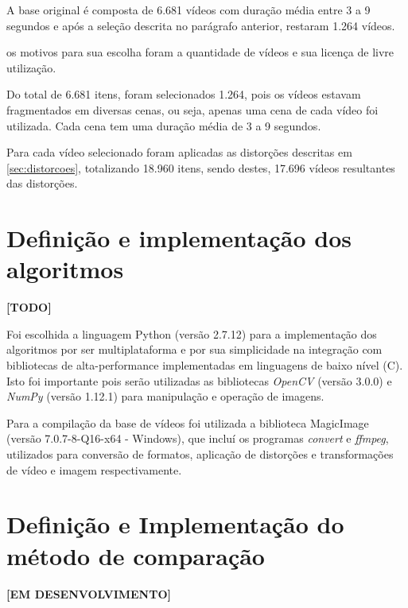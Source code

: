 A base original é composta de 6.681 vídeos com duração média entre 3 a 9 segundos e após a seleção descrita no parágrafo anterior, restaram 1.264 vídeos. 

os motivos para sua escolha foram a quantidade de vídeos e sua licença de livre utilização. 

Do total de 6.681 itens, foram selecionados 1.264, pois os vídeos estavam fragmentados em diversas cenas, ou seja, apenas uma cena de cada vídeo foi utilizada. Cada cena tem uma duração média de 3 a 9 segundos.

Para cada vídeo selecionado foram aplicadas as distorções descritas em \ref{sec:distorcoes}, totalizando 18.960 itens, sendo destes, 17.696 vídeos resultantes das distorções.

\section{Definição e implementação dos algoritmos}

\textbf{[TODO]}


Foi escolhida a linguagem Python (versão 2.7.12) para a implementação dos algoritmos por ser multiplataforma e  por sua simplicidade na integração com bibliotecas de alta-performance implementadas em linguagens de baixo nível (C). Isto foi importante pois serão utilizadas as bibliotecas \textit{OpenCV} (versão 3.0.0) e \textit{NumPy} (versão 1.12.1) para manipulação e operação de imagens.

Para a compilação da base de vídeos foi utilizada a biblioteca MagicImage (versão 7.0.7-8-Q16-x64 - Windows), que incluí os programas \textit{convert} e \textit{ffmpeg}, utilizados para conversão de formatos, aplicação de distorções e transformações de vídeo e imagem respectivamente.

\section{Definição e Implementação do método de comparação}


\textbf{[EM DESENVOLVIMENTO]}




